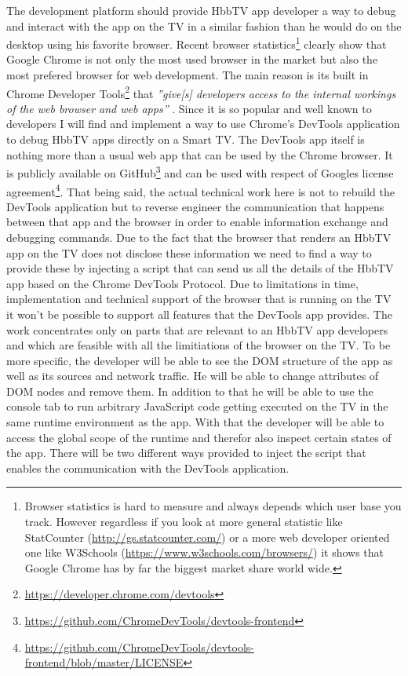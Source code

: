 The development platform should provide HbbTV app developer a way to debug and interact with the app on the TV in a
similar fashion than he would do on the desktop using his favorite browser. Recent browser statistics\footnote{Browser
statistics is hard to measure and always depends which user base you track. However regardless if you look at more
general statistic like StatCounter (\url{http://gs.statcounter.com/}) or a more web developer oriented one like
W3Schools (\url{https://www.w3schools.com/browsers/}) it shows that Google Chrome has by far the biggest market
share world wide.} clearly show that Google Chrome is not only the most used browser in the market but also the most
prefered browser for web development. The main reason is its built in Chrome Developer Tools\footnote{\url{https://developer.chrome.com/devtools}}
that \textit{''give[s] developers access to the internal workings of the web browser and web apps''} \cite{devtools}.
Since it is so popular and well known to developers I will find and implement a way to use Chrome's DevTools
application to debug HbbTV apps directly on a Smart TV. The DevTools app itself is nothing more than a usual web app
that can be used by the Chrome browser. It is publicly available on GitHub\footnote{\url{https://github.com/ChromeDevTools/devtools-frontend}}
and can be used with respect of Googles license agreement\footnote{\url{https://github.com/ChromeDevTools/devtools-frontend/blob/master/LICENSE}}.
That being said, the actual technical work here is not to rebuild the DevTools application but to reverse
engineer the communication that happens between that app and the browser in order to enable information exchange
and debugging commands. Due to the fact that the browser that renders an HbbTV app on the TV does not disclose
these information we need to find a way to provide these by injecting a script that can send us all the details
of the HbbTV app based on the Chrome DevTools Protocol. Due to limitations in time, implementation and
technical support of the browser that is running on the TV it won't be possible to support all features
that the DevTools app provides. The work concentrates only on parts that are relevant to an HbbTV app
developers and which are feasible with all the limitiations of the browser on the TV. To be more specific,
the developer will be able to see the DOM structure of the app as well as its sources and network traffic.
He will be able to change attributes of DOM nodes and remove them. In addition to that he will be able to
use the console tab to run arbitrary JavaScript code getting executed on the TV in the same runtime environment
as the app. With that the developer will be able to access the global scope of the runtime and therefor
also inspect certain states of the app. There will be two different ways provided to inject the script that
enables the communication with the DevTools application.

